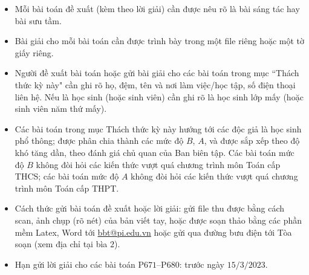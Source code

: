 \thispagestyle{thachthuctoanhocnone}
\pagestyle{thachthuctoanhoc}
\everymath{\color{thachthuctoanhoc}}
\graphicspath{{../thachthuctoanhoc/pic/}}
\begingroup
{}
\centering
\vspace*{4cm}
\endgroup
\vspace*{-8pt}
\begin{tBox}
	\begin{itemize}[leftmargin = 13pt, itemsep = 1.0pt] 
		\item Mỗi bài toán đề xuất (kèm theo lời giải) cần được nêu rõ là bài sáng tác hay bài sưu tầm.
		\item Bài giải cho mỗi bài toán cần được trình bày trong một file riêng hoặc
		một tờ giấy riêng.
		\item  Người đề xuất bài toán hoặc gửi bài giải cho các bài toán trong mục ``Thách thức kỳ này" cần ghi rõ họ, đệm, tên và nơi làm việc/học tập, số điện thoại liên hệ. Nếu là học sinh (hoặc sinh viên) cần ghi rõ là học sinh lớp mấy (hoặc sinh viên năm thứ mấy).
		\item Các bài toán trong mục Thách thức kỳ này hướng tới các độc giả là học sinh phổ thông; được phân chia thành các mức độ $B$, $A$, và được sắp xếp theo độ khó tăng dần, theo đánh giá chủ quan của Ban biên tập. Các bài toán mức độ $B$ không đòi hỏi các kiến thức vượt quá chương trình môn Toán cấp THCS; các bài toán mức độ $A$ không đòi hỏi các kiến thức vượt quá chương trình môn Toán cấp THPT.
		\item Cách thức gửi bài toán đề xuất hoặc lời giải: gửi file thu được bằng cách scan, ảnh chụp (rõ nét) của bản viết tay, hoặc được soạn thảo bằng các phần mềm Latex, Word tới \url{bbt@pi.edu.vn} hoặc gửi qua đường bưu điện tới Tòa soạn (xem địa chỉ tại bìa $2$).
		\item Hạn gửi lời giải cho các bài toán P$671$--P$680$: trước ngày $15/3/2023$.
	\end{itemize}
\end{tBox}
